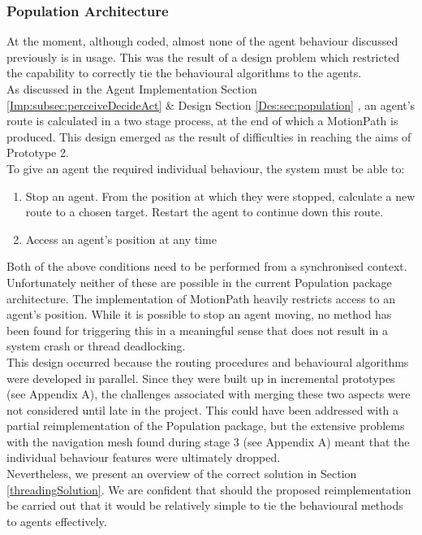 \subsubsection{Population Architecture}
At the moment, although coded, almost none of the agent behaviour discussed previously is in usage. This was the result of a design problem which restricted the capability to correctly tie the behavioural algorithms to the agents.\\
As discussed in the Agent Implementation Section \ref{Imp:subsec:perceiveDecideAct} \& Design Section \ref{Des:sec:population} , an agent's route is calculated in a two stage process, at the end of which a MotionPath is produced. This design emerged as the result of difficulties in reaching the aims of Prototype 2.\\
To give an agent the required individual behaviour, the system must be able to:
\begin{enumerate}
\item{Stop an agent. From the position at which they were stopped, calculate a new route to a chosen target. Restart the agent to continue down this route.}
\item{Access an agent's position at any time}
\end{enumerate}
Both of the above conditions need to be performed from a synchronised context. Unfortunately neither of these are possible in the current Population package architecture. The implementation of MotionPath heavily restricts access to an agent's position. While it is possible to stop an agent moving, no method has been found for triggering this in a meaningful sense that does not result in a system crash or thread deadlocking.\\
This design occurred because the routing procedures and behavioural algorithms were developed in parallel. Since they were built up in incremental prototypes (see Appendix A), the challenges associated with merging these two aspects were not considered until late in the project. This could have been addressed with a partial reimplementation of the Population package, but the extensive problems with the navigation mesh found during stage 3 (see Appendix A) meant that the individual behaviour features were ultimately dropped.\\
Nevertheless, we present an overview of the correct solution in Section \ref{threadingSolution}. We are confident that should the proposed reimplementation be carried out that it would be relatively simple to tie the behavioural methods to agents effectively.
